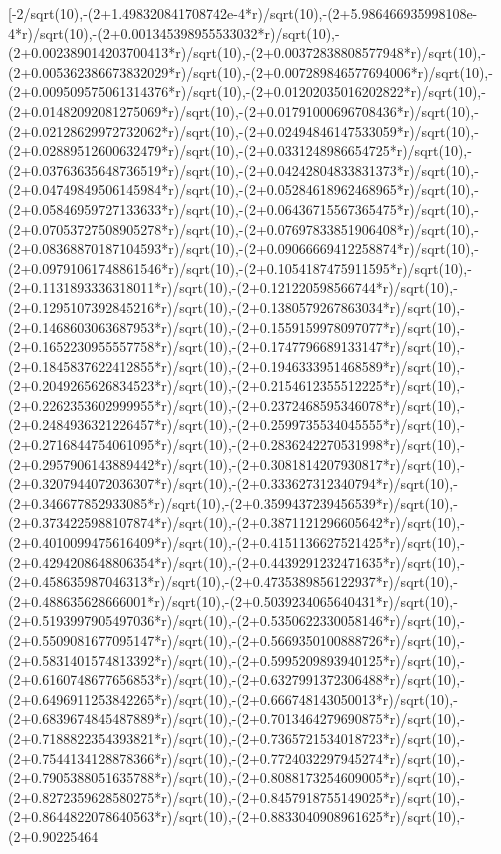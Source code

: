 \documentclass[a4paper,10pt]{article}
\begin{document}
\begin{eulernotebook}
\begin{eulercomment}
\begin{eulercomment}
\begin{eulercomment}
\begin{eulercomment}
\begin{eulercomment}
\begin{eulercomment}
\begin{eulercomment}
\begin{eulercomment}
\begin{eulercomment}
\begin{eulercomment}
\begin{eulercomment}
\begin{eulercomment}
\begin{eulercomment}
\begin{eulercomment}
\begin{eulercomment}
\begin{eulercomment}
\begin{euleroutput}
[-2/sqrt(10),-(2+1.498320841708742e-4*r)/sqrt(10),-(2+5.986466935998108e-4*r)/sqrt(10),-(2+0.001345398955533032*r)/sqrt(10),-(2+0.002389014203700413*r)/sqrt(10),-(2+0.00372838808577948*r)/sqrt(10),-(2+0.005362386673832029*r)/sqrt(10),-(2+0.007289846577694006*r)/sqrt(10),-(2+0.009509575061314376*r)/sqrt(10),-(2+0.01202035016202822*r)/sqrt(10),-(2+0.01482092081275069*r)/sqrt(10),-(2+0.01791000696708436*r)/sqrt(10),-(2+0.02128629972732062*r)/sqrt(10),-(2+0.02494846147533059*r)/sqrt(10),-(2+0.02889512600632479*r)/sqrt(10),-(2+0.0331248986654725*r)/sqrt(10),-(2+0.03763635648736519*r)/sqrt(10),-(2+0.04242804833831373*r)/sqrt(10),-(2+0.04749849506145984*r)/sqrt(10),-(2+0.05284618962468965*r)/sqrt(10),-(2+0.05846959727133633*r)/sqrt(10),-(2+0.06436715567365475*r)/sqrt(10),-(2+0.07053727508905278*r)/sqrt(10),-(2+0.07697833851906408*r)/sqrt(10),-(2+0.08368870187104593*r)/sqrt(10),-(2+0.09066669412258874*r)/sqrt(10),-(2+0.09791061748861546*r)/sqrt(10),-(2+0.1054187475911595*r)/sqrt(10),-(2+0.1131893336318011*r)/sqrt(10),-(2+0.121220598566744*r)/sqrt(10),-(2+0.1295107392845216*r)/sqrt(10),-(2+0.1380579267863034*r)/sqrt(10),-(2+0.1468603063687953*r)/sqrt(10),-(2+0.1559159978097077*r)/sqrt(10),-(2+0.1652230955557758*r)/sqrt(10),-(2+0.1747796689133147*r)/sqrt(10),-(2+0.1845837622412855*r)/sqrt(10),-(2+0.1946333951468589*r)/sqrt(10),-(2+0.2049265626834523*r)/sqrt(10),-(2+0.2154612355512225*r)/sqrt(10),-(2+0.2262353602999955*r)/sqrt(10),-(2+0.2372468595346078*r)/sqrt(10),-(2+0.2484936321226457*r)/sqrt(10),-(2+0.2599735534045555*r)/sqrt(10),-(2+0.2716844754061095*r)/sqrt(10),-(2+0.2836242270531998*r)/sqrt(10),-(2+0.2957906143889442*r)/sqrt(10),-(2+0.3081814207930817*r)/sqrt(10),-(2+0.3207944072036307*r)/sqrt(10),-(2+0.333627312340794*r)/sqrt(10),-(2+0.346677852933085*r)/sqrt(10),-(2+0.3599437239456539*r)/sqrt(10),-(2+0.3734225988107874*r)/sqrt(10),-(2+0.3871121296605642*r)/sqrt(10),-(2+0.4010099475616409*r)/sqrt(10),-(2+0.4151136627521425*r)/sqrt(10),-(2+0.4294208648806354*r)/sqrt(10),-(2+0.4439291232471635*r)/sqrt(10),-(2+0.458635987046313*r)/sqrt(10),-(2+0.4735389856122937*r)/sqrt(10),-(2+0.488635628666001*r)/sqrt(10),-(2+0.5039234065640431*r)/sqrt(10),-(2+0.5193997905497036*r)/sqrt(10),-(2+0.5350622330058146*r)/sqrt(10),-(2+0.5509081677095147*r)/sqrt(10),-(2+0.5669350100888726*r)/sqrt(10),-(2+0.5831401574813392*r)/sqrt(10),-(2+0.5995209893940125*r)/sqrt(10),-(2+0.6160748677656853*r)/sqrt(10),-(2+0.6327991372306488*r)/sqrt(10),-(2+0.6496911253842265*r)/sqrt(10),-(2+0.666748143050013*r)/sqrt(10),-(2+0.6839674845487889*r)/sqrt(10),-(2+0.7013464279690875*r)/sqrt(10),-(2+0.7188822354393821*r)/sqrt(10),-(2+0.7365721534018723*r)/sqrt(10),-(2+0.7544134128878366*r)/sqrt(10),-(2+0.7724032297945274*r)/sqrt(10),-(2+0.7905388051635788*r)/sqrt(10),-(2+0.8088173254609005*r)/sqrt(10),-(2+0.8272359628580275*r)/sqrt(10),-(2+0.8457918755149025*r)/sqrt(10),-(2+0.8644822078640563*r)/sqrt(10),-(2+0.8833040908961625*r)/sqrt(10),-(2+0.90225464
\end{euleroutput}
\end{eulercomment}
\end{eulercomment}
\end{eulercomment}
\end{eulercomment}
\end{eulercomment}
\end{eulercomment}
\end{eulercomment}
\end{eulercomment}
\end{eulercomment}
\end{eulercomment}
\end{eulercomment}
\end{eulercomment}
\end{eulercomment}
\end{eulercomment}
\end{eulercomment}
\end{eulercomment}
\end{eulernotebook}
\end{document}
